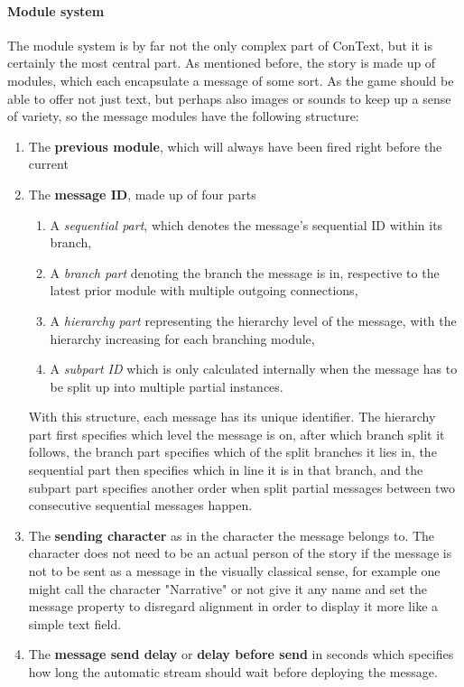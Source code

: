 \paragraph{Module system} The module system is by far not the only complex part of ConText, but it is certainly the most central part. As mentioned before, the story is made up of modules, which each encapsulate a message of some sort. As the game should be able to offer not just text, but perhaps also images or sounds to keep up a sense of variety, so the message modules have the following structure:
\begin{enumerate}
\item The \textbf{previous module}, which will always have been fired right before the current
\item The \textbf{message ID}, made up of four parts
	\begin{enumerate}
	\item A \textit{sequential part}, which denotes the message's sequential ID within its branch, 
	\item A \textit{branch part} denoting the branch the message is in, respective to the latest prior module with multiple outgoing connections, 
	\item A \textit{hierarchy part} representing the hierarchy level of the message, with the hierarchy increasing for each branching module, 
	\item A \textit{subpart ID} which is only calculated internally when the message has to be split up into multiple partial instances.
	\end{enumerate}
	With this structure, each message has its unique identifier. The hierarchy part first specifies which level the message is on, after which branch split it follows, the branch part specifies which of the split branches it lies in, the sequential part then specifies which in line it is in that branch, and the subpart part specifies another order when split partial messages between two consecutive sequential messages happen.
\item The \textbf{sending character} as in the character the message belongs to. The character does not need to be an actual person of the story if the message is not to be sent as a message in the visually classical sense, for example one might call the character "Narrative" or not give it any name and set the message property to disregard alignment in order to display it more like a simple text field.
\item The \textbf{message send delay} or \textbf{delay before send} in seconds which specifies how long the automatic stream should wait before deploying the message.

\end{enumerate}
